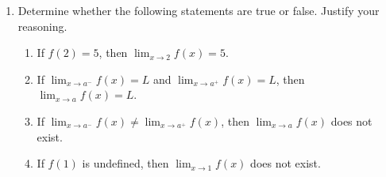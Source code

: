 \documentclass[12pt]{article}
\newenvironment{solution}{\begin{proof}[Solution]}{\end{proof}}
\begin{document}
\begin{enumerate}
		\bigskip
		
		\begin{solution}
			
				\begin{multicols}{3}
				\begin{enumerate}
					\item $\displaystyle{\lim_{x\to 0^-} f(x)}=0$
					\item $\displaystyle{\lim_{x\to 0^+} f(x)}=0$
					\item $\displaystyle{\lim_{x\to 0} f(x)}=0$
					\item $f(0)$ DNE
					\item $\displaystyle{\lim_{x\to 1^-} f(x)}=1$
					\item $\displaystyle{\lim_{x\to 1^+} f(x)}=1$
					\item $\displaystyle{\lim_{x\to 1} f(x)}=1$
					\item $f(1)=1$
					\item $\displaystyle{\lim_{x\to 2^-} f(x)}=4$
					\item $\displaystyle{\lim_{x\to 2^+} f(x)}=2$
					\item $\displaystyle{\lim_{x\to 2} f(x)}$ DNE
					\item $f(2)=3$
				\end{enumerate}
			\end{multicols}
		\end{solution}
		
		\item Determine whether the following statements are true or false. Justify your reasoning.
		
		\begin{enumerate}
		
			
			\item If $f(2)=5$, then $\displaystyle \lim_{x\to 2}f(x)=5$.
			
			\item If $\displaystyle \lim_{x\to a^-}f(x)=L$ and 
			$\displaystyle \lim_{x\to a^+}f(x)=L$, then 
			$\displaystyle \lim_{x\to a}f(x)=L$.
			
			\item If $\displaystyle \lim_{x\to a^-}f(x)\neq
			\lim_{x\to a^+}f(x)$, then $\displaystyle \lim_{x\to a}f(x)$
			does not exist.
			
			
			
			\item If $f(1)$ is undefined, then 
			$\displaystyle \lim_{x\to 1}f(x)$ does not exist.
		\end{enumerate}
		

\end{enumerate}
\end{document}
